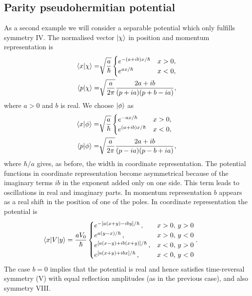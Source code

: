 \subsection{Parity pseudohermitian potential}
%
%
As a second example we will consider  a separable potential which only fulfills symmetry IV. The normalised vector $\ket{\chi}$ in position and momentum representation is
%
\begin{eqnarray}
\braket{x}{\chi}=& \sqrt{\frac{a}{\hbar}} \begin{cases}
e^{-(a+ib)x/\hbar}  &x>0,\\ e^{a x/\hbar} &x<0,
\end{cases} \nonumber \\
\braket{p}{\chi}=&  \sqrt{\frac{a}{2\pi}} \frac{2 a+ i b}{(p+ia)(p+b-i a)},
\end{eqnarray}
%
where $a>0$ and $b$ is real.
We choose $\ket{\phi}$ as
%
\begin{eqnarray}
\braket{x}{\phi}=& \sqrt{\frac{a}{\hbar}} \begin{cases}
e^{-a x/\hbar} &x>0,\\ e^{(a+i b)x/\hbar} &x<0,
\end{cases} \nonumber \\
\braket{p}{\phi}=& \sqrt{\frac{a}{2\pi}} \frac{2 a+i b}{(p-ia)(p-b+i a)},
\end{eqnarray}
%
where $\hbar/a$ gives, as before, the width in coordinate representation. The potential functions in coordinate representation become asymmetrical
because of the  imaginary terms  $ib$ in  the exponent added only on  one side. This term leads to oscillations in real and imaginary parts. In momentum representation $b$ appears as a real shift in the position of one of the poles.
%
In coordinate representation the potential is
%
\begin{eqnarray}
\hspace*{-0.6cm}\la x|V|y\ra=  \frac{aV_{0}}{\hbar} \begin{cases}
e^{-\left[a (x+y) - i b y\right]/\hbar} \, ,&x>0,\,y>0\\
e^{a(y-x)/\hbar} \,  ,&x>0, \,y<0\\
e^{\left[a(x-y)+i b(x+y)\right]/\hbar} \,  ,&x<0,\,y>0\\
e^{\left[a(x+y)+i b x\right]/\hbar} \,  ,&x<0,\,y<0
\end{cases}.
\label{Ppot}
\end{eqnarray}
%
The case $b=0$ implies that the potential is real and hence satisfies time-reversal symmetry (V) with equal reflection amplitudes (as in the previous case), and also symmetry VIII.


